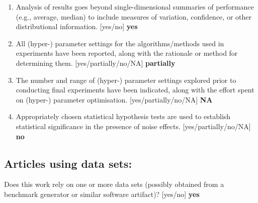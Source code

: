\begin{enumerate}
    Reported results have not been ``cherry-picked'' by silently ignoring unsuccessful or unsatisfactory experiments.
    [yes/partially/no] \textbf{yes}
    \item
    Analysis of results goes beyond single-dimensional summaries of performance (e.g., average, median) to include measures of variation, confidence, or other distributional information.
    [yes/no] \textbf{yes}
    \item
    All (hyper-) parameter settings for
    the algorithms/methods used in experiments have been reported, along with the rationale or method for determining them.
    [yes/partially/no/NA] \textbf{partially}
    \item
    The number and range of (hyper-) parameter settings explored prior to conducting final experiments have been indicated, along with the effort spent on (hyper-) parameter optimisation.
    [yes/partially/no/NA] \textbf{NA}
    \item
    Appropriately chosen statistical hypothesis tests are used to establish statistical significance
    in the presence of noise effects.
    [yes/partially/no/NA] \textbf{no}
\end{enumerate}


\subsection*{Articles using data sets:}
Does this work rely on one or more data sets (possibly obtained from a benchmark generator or similar software artifact)?
[yes/no] \textbf{yes}

